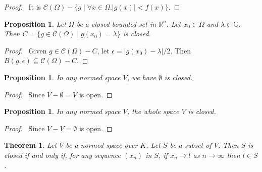 \documentclass{book}
\let\qed\relax
\newtheorem{prop}[ax]{Proposition}
\newtheorem{thm}[ax]{Theorem}
\theoremstyle{definition}
\begin{document}
\begin{proof}
\pf\ It is $\mathcal{C}(\Omega) - \{ g \mid \forall x \in \Omega. |g(x)| < f(x) \}$. \qed
\end{proof}

\begin{prop}
Let $\Omega$ be a closed bounded set in $\mathbb{R}^n$. Let $x_0 \in \Omega$ and $\lambda \in \mathbb{C}$. Then $C = \{ g \in \mathcal{C}(\Omega) \mid g(x_0) = \lambda \}$ is closed.
\end{prop}

\begin{proof}
\pf\ Given $g \in \mathcal{C}(\Omega) - C$, let $\epsilon = |g(x_0) - \lambda|/2$. Then $B(g,\epsilon) \subseteq \mathcal{C}(\Omega) - C$. \qed
\end{proof}

\begin{prop}
In any normed space $V$, we have $\emptyset$ is closed.
\end{prop}

\begin{proof}
\pf\ Since $V - \emptyset = V$ is open. \qed
\end{proof}

\begin{prop}
In any normed space $V$, the whole space $V$ is closed.
\end{prop}

\begin{proof}
\pf\ Since $V - V = \emptyset$ is open. \qed
\end{proof}

\begin{thm}
\label{thm:closedconverge}
Let $V$ be a normed space over $K$. Let $S$ be a subset of $V$. Then $S$ is closed if and only if, for any sequence $(x_n)$ in $S$, if $x_n \rightarrow l$ as $n \rightarrow \infty$ then $l \in S$.
\end{thm}
\end{document}
